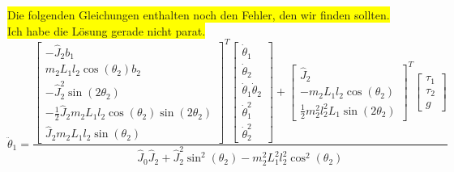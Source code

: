 \colorbox{yellow}{Die folgenden Gleichungen enthalten noch den Fehler, den wir finden sollten.} \\
\colorbox{yellow}{Ich habe die Lösung gerade nicht parat.}
\begin{equation}
\ddot{\theta}_1 =
\frac{
\begin{bmatrix}
-\hat{J}_2b_1 \\ 
m_2L_1l_2\cos(\theta_2)b_2 \\ 
-\hat{J}^2_2\sin(2\theta_2) \\ 
-\frac{1}{2}\hat{J}_2m_2L_1l_2\cos(\theta_2)\sin(2\theta_2) \\ 
\hat{J}_2m_2L_1l_2\sin(\theta_2)
\end{bmatrix}^T
\begin{bmatrix}
\dot{\theta}_1 \\ 
\dot{\theta}_2 \\ 
\dot{\theta}_1\dot{\theta}_2 \\ 
\dot{\theta}^2_1 \\ 
\dot{\theta}^2_2
\end{bmatrix}
+
\begin{bmatrix}
\hat{J}_2 \\ 
-m_2L_1l_2\cos(\theta_2) \\ 
\frac{1}{2}m^2_2l^2_2L_1\sin(2\theta_2)
\end{bmatrix}^T
\begin{bmatrix}
\tau_1 \\ 
\tau_2 \\ 
g
\end{bmatrix} }
{\hat{J}_0\hat{J}_2+\hat{J}^2_2\sin^2(\theta_2)-m^2_2L^2_1l^2_2\cos^2(\theta_2)}
\end{equation}



